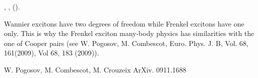 \documentclass[aps,prb,superscriptaddress,twocolumn]{revtex4}
\begin{document}
\begin{thebibliography}{9}
 
  ,
  \textbf{},  ().
  
    Wannier excitons have two degrees of freedom while Frenkel excitons have one only. This is why the Frenkel exciton many-body physics has similarities with the one of Cooper pairs (see  W. Pogosov, M. Combescot, Euro. Phys. J. B, Vol. 68, 161(2009), Vol 68, 183 (2009)).
  
  



%
W. Pogosov, M. Combescot, M. Crouzeix ArXiv. 0911.1688
 
\end{thebibliography}
\end{document}
